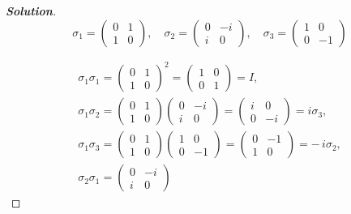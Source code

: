 \documentclass[a4paper,11pt]{article}
\newenvironment{solution}[1]
  {\renewcommand\qedsymbol{$\square$}\begin{proof}[\textbf{Solution#1}]}
  {\end{proof}}
\begin{document}
\begin{solution}{}
    \begin{equation}
        \sigma_1 = \begin{pmatrix} 0 & 1 \\ 1 & 0 \end{pmatrix}, \quad
        \sigma_2 = \begin{pmatrix} 0 & -i \\ i & 0 \end{pmatrix}, \quad
        \sigma_3 = \begin{pmatrix} 1 & 0 \\ 0 & -1 \end{pmatrix}
    \end{equation}
    
    \begin{gather}
        \sigma_1\sigma_1 = \begin{pmatrix} 0 & 1 \\ 1 & 0 \end{pmatrix}^2 
        = \begin{pmatrix} 1 & 0 \\ 0 & 1 \end{pmatrix} = I, \\
        \sigma_1\sigma_2 = \begin{pmatrix} 0 & 1 \\ 1 & 0 \end{pmatrix}
        \begin{pmatrix} 0 & -i \\ i & 0 \end{pmatrix} 
        = \begin{pmatrix} i & 0 \\ 0 & -i \end{pmatrix} = i\sigma_3, \\
        \sigma_1\sigma_3 = \begin{pmatrix} 0 & 1 \\ 1 & 0 \end{pmatrix}
        \begin{pmatrix} 1 & 0 \\ 0 & -1 \end{pmatrix} 
        = \begin{pmatrix} 0 & -1 \\ 1 & 0 \end{pmatrix} = -\,i\sigma_2, \\
        \sigma_2\sigma_1 = \begin{pmatrix} 0 & -i \\ i & 0 \end{pmatrix}

\end{gather}
\end{solution}
\end{document}
